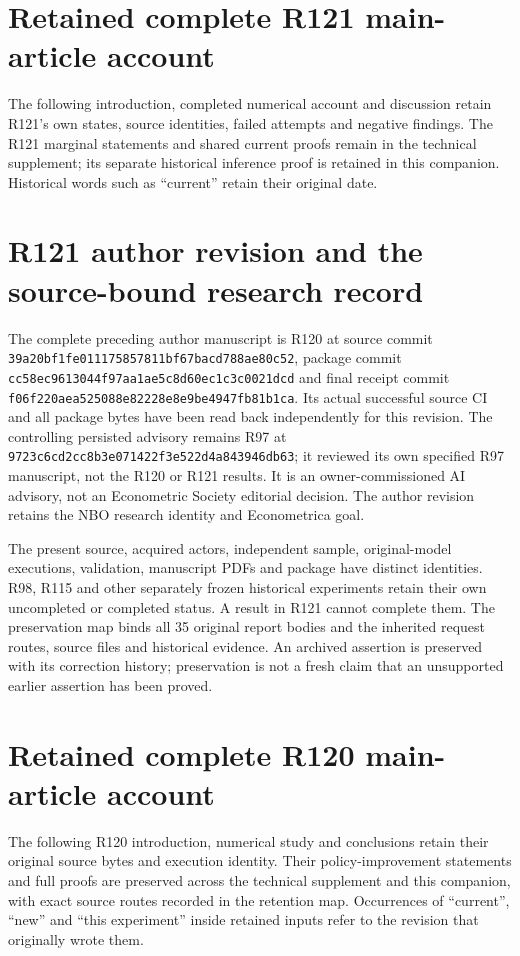 \documentclass[ecta,nameyear,draft]{econsocart}
\begin{document}
\section{Retained complete R121 main-article account}
\label{dev:main121}
The following introduction, completed numerical account and discussion retain
R121's own states, source identities, failed attempts and negative findings.
The R121 marginal statements and shared current proofs remain in the technical
supplement; its separate historical inference proof is retained in this companion. Historical words such as ``current'' retain their original date.



\section{R121 author revision and the source-bound research record}
\label{dev:custody121}
The complete preceding author manuscript is R120 at source commit
\nolinkurl{39a20bf1fe011175857811bf67bacd788ae80c52}, package commit
\nolinkurl{cc58ec9613044f97aa1ae5c8d60ec1c3c0021dcd} and final receipt commit
\nolinkurl{f06f220aea525088e82228e8e9be4947fb81b1ca}. Its actual successful
source CI and all package bytes have been read back independently for this
revision. The controlling persisted advisory remains R97 at
\nolinkurl{9723c6cd2cc8b3e071422f3e522d4a843946db63}; it reviewed its own
specified R97 manuscript, not the R120 or R121 results. It is an
owner-commissioned AI advisory, not an Econometric Society editorial decision.
The author revision retains the NBO research identity and Econometrica goal.

The present source, acquired actors, independent sample, original-model
executions, validation, manuscript PDFs and package have distinct identities.
R98, R115 and other separately frozen historical experiments retain their own
uncompleted or completed status. A result in R121 cannot complete them.
The preservation map binds all 35 original report bodies and the inherited
request routes, source files and historical evidence. An archived assertion
is preserved with its correction history; preservation is not a fresh claim
that an unsupported earlier assertion has been proved.


\section{Retained complete R120 main-article account}
\label{dev:main120}
The following R120 introduction, numerical study and conclusions retain their
original source bytes and execution identity. Their policy-improvement
statements and full proofs are preserved across the technical supplement and
this companion, with exact source routes recorded in the retention map.
Occurrences of ``current'', ``new'' and ``this experiment'' inside retained
inputs refer to the revision that originally wrote them.



\end{document}
